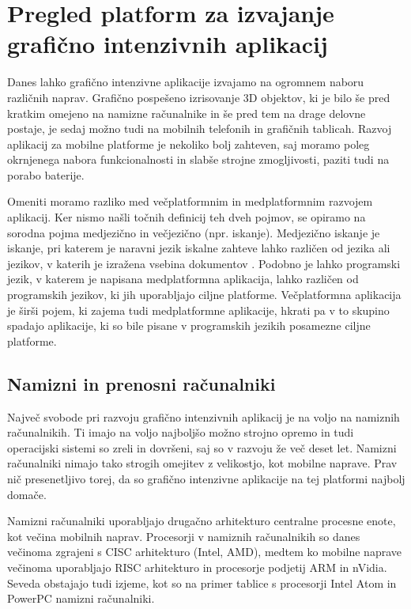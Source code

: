 \chapter{Pregled platform za izvajanje grafično intenzivnih aplikacij}

Danes lahko grafično intenzivne aplikacije izvajamo na ogromnem naboru različnih naprav. Grafično pospešeno izrisovanje 3D objektov, ki je bilo še pred kratkim omejeno na namizne računalnike in še pred tem na drage delovne postaje, je sedaj možno tudi na mobilnih telefonih in grafičnih tablicah. Razvoj aplikacij za mobilne platforme je nekoliko bolj zahteven, saj moramo poleg okrnjenega nabora funkcionalnosti in slabše strojne zmogljivosti, paziti tudi na porabo baterije.

Omeniti moramo razliko med večplatformnim in medplatformnim razvojem aplikacij. Ker nismo našli točnih definicij teh dveh pojmov, se opiramo na sorodna pojma medjezično in večjezično (npr. iskanje). Medjezično iskanje je iskanje, pri katerem je naravni jezik iskalne zahteve lahko različen od jezika ali jezikov, v katerih je izražena vsebina dokumentov \cite{jezicno}. Podobno je lahko programski jezik, v katerem je napisana medplatformna aplikacija, lahko različen od programskih jezikov, ki jih uporabljajo ciljne platforme. Večplatformna aplikacija je širši pojem, ki zajema tudi medplatformne aplikacije, hkrati pa v to skupino spadajo aplikacije, ki so bile pisane v programskih jezikih posamezne ciljne platforme.

\section{Namizni in prenosni računalniki}

Največ svobode pri razvoju grafično intenzivnih aplikacij je na voljo na namiznih računalnikih. Ti imajo na voljo najboljšo možno strojno opremo in tudi operacijski sistemi so zreli in dovršeni, saj so v razvoju že več deset let. Namizni računalniki nimajo tako strogih omejitev z velikostjo, kot mobilne naprave. Prav nič presenetljivo torej, da so grafično intenzivne aplikacije na tej platformi najbolj domače. 

Namizni računalniki uporabljajo drugačno arhitekturo centralne procesne enote, kot večina mobilnih naprav. Procesorji v namiznih računalnikih so danes večinoma  zgrajeni s CISC arhitekturo (Intel, AMD), medtem ko mobilne naprave večinoma uporabljajo RISC arhitekturo in procesorje podjetij ARM in nVidia. Seveda obstajajo tudi izjeme, kot so na primer tablice s procesorji Intel Atom in PowerPC namizni računalniki.  

